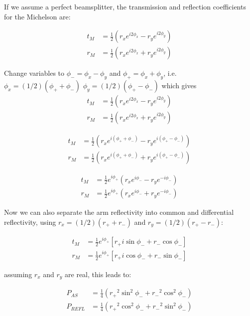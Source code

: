 If we assume a perfect beamsplitter, the transmission and reflection
coefficients for the Michelson are:

\begin{align}
t_M  &= \frac{1}{2}\left(r_x e^{i2\phi_x} - r_y e^{i2\phi_y} \right) \\
r_M  &= \frac{1}{2}\left(r_x e^{i2\phi_x} + r_y e^{i2\phi_y} \right)
\end{align}

Change variables to 
$\phi_- = \phi_x - \phi_y$ and 
$\phi_+ = \phi_x + \phi_y$, i.e. 
%
$\phi_x = (1/2)\left(\phi_+ + \phi_-\right)$
$\phi_y = (1/2)\left(\phi_+ - \phi_-\right)$
which gives
\begin{align}
t_M  &= \frac{1}{2}\left(r_x e^{i2\phi_x} - r_y e^{i2\phi_y} \right) \\
r_M  &= \frac{1}{2}\left(r_x e^{i2\phi_x} + r_y e^{i2\phi_y} \right)
\end{align}

\begin{align}
t_M  &= \frac{1}{2}\left(r_x e^{i\left(\phi_+ + \phi_- \right)} - r_y e^{i\left(\phi_+ - \phi_-\right)} \right) \\
r_M  &= \frac{1}{2}\left(r_x e^{i\left(\phi_+ + \phi_- \right)} + r_y e^{i\left(\phi_+ - \phi_-\right)} \right) 
\end{align}

\begin{align}
t_M  &= \frac{1}{2} e^{i\phi_+} \left(r_x e^{i \phi_- } - r_y e^{-i \phi_-} \right) \\
r_M  &= \frac{1}{2} e^{i\phi_+} \left(r_x e^{i \phi_- } + r_y e^{-i \phi_-} \right) 
\end{align}

Now we can also separate the arm reflectivity into common and differential reflectivity, using $r_x = (1/2)(r_+ + r_-)$ and $r_y = (1/2)(r_+ - r_-)$:

\begin{align}
t_M  &= \frac{1}{2} e^{i\phi_+} \left[ r_+ i \sin \phi_- + r_- \cos \phi_- \right]\\
r_M  &= \frac{1}{2} e^{i\phi_+} \left[ r_+ i \cos \phi_- + r_- \sin \phi_- \right] 
\end{align}

assuming $r_x$ and $r_y$ are real, this leads to:

\begin{align}
P_{AS}   &= \frac{1}{4}\left( {r_+}^2 \sin^2 \phi_- + {r_-}^2 \cos^2 \phi_-\right) \\
P_{REFL} &= \frac{1}{4}\left( {r_+}^2 \cos^2 \phi_- + {r_-}^2 \sin^2 \phi_-\right) \\
\end{align}

